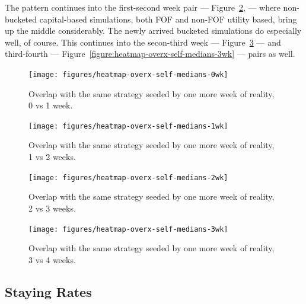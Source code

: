\documentclass[10pt,oneside]{memoir}
\begin{document}
The pattern continues into the first-second week pair --- Figure~\ref{figure:heatmap-overx-self-medians-1wk}, --- where non-bucketed capital-based simulations, both FOF and non-FOF utility based, bring up the middle considerably.  The newly arrived bucketed simulations do especially well, of course.  This continues into the secon-third week --- Figure~\ref{figure:heatmap-overx-self-medians-2wk} --- and third-fourth --- Figure~\ref{figure:heatmap-overx-self-medians-3wk} --- pairs as well.



\begin{figure}
\begin{center}
    \texttt{[image: figures/heatmap-overx-self-medians-0wk]}
    \caption{Overlap with the same strategy seeded by one more week of reality, 0 vs 1 week.}
    \label{figure:heatmap-overx-self-medians-0wk}
\end{center}
\end{figure}

\begin{figure}
\begin{center}
    \texttt{[image: figures/heatmap-overx-self-medians-1wk]}
    \caption{Overlap with the same strategy seeded by one more week of reality, 1 vs 2 weeks.}
    \label{figure:heatmap-overx-self-medians-1wk}
\end{center}
\end{figure}

\begin{figure}
\begin{center}
    \texttt{[image: figures/heatmap-overx-self-medians-2wk]}
    \caption{Overlap with the same strategy seeded by one more week of reality, 2 vs 3 weeks.}
    \label{figure:heatmap-overx-self-medians-2wk}
\end{center}
\end{figure}

\begin{figure}
\begin{center}
    \texttt{[image: figures/heatmap-overx-self-medians-3wk]}
    \caption{Overlap with the same strategy seeded by one more week of reality, 3 vs 4 weeks.}
    \label{figure:heatmap-overx-self-medians-4wk}
\end{center}
\end{figure}
\pagebreak \subsection{Staying Rates}
\label{stayingrates}
\end{document}
